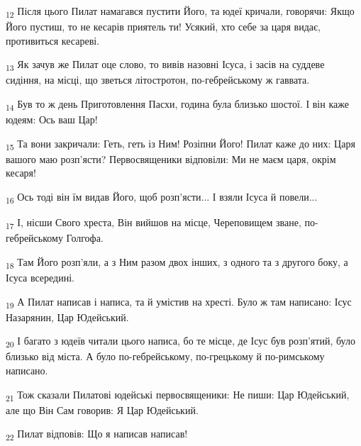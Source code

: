 \begin{tcolorbox}
\textsubscript{12} Після цього Пилат намагався пустити Його, та юдеї кричали, говорячи: Якщо Його пустиш, то не кесарів приятель ти! Усякий, хто себе за царя видає, противиться кесареві.
\end{tcolorbox}
\begin{tcolorbox}
\textsubscript{13} Як зачув же Пилат оце слово, то вивів назовні Ісуса, і засів на суддеве сидіння, на місці, що зветься літостротон, по-гебрейському ж гаввата.
\end{tcolorbox}
\begin{tcolorbox}
\textsubscript{14} Був то ж день Приготовлення Пасхи, година була близько шостої. І він каже юдеям: Ось ваш Цар!
\end{tcolorbox}
\begin{tcolorbox}
\textsubscript{15} Та вони закричали: Геть, геть із Ним! Розіпни Його! Пилат каже до них: Царя вашого маю розп'ясти? Первосвященики відповіли: Ми не маєм царя, окрім кесаря!
\end{tcolorbox}
\begin{tcolorbox}
\textsubscript{16} Ось тоді він їм видав Його, щоб розп'ясти... І взяли Ісуса й повели...
\end{tcolorbox}
\begin{tcolorbox}
\textsubscript{17} І, нісши Свого хреста, Він вийшов на місце, Череповищем зване, по-гебрейському Голгофа.
\end{tcolorbox}
\begin{tcolorbox}
\textsubscript{18} Там Його розп'яли, а з Ним разом двох інших, з одного та з другого боку, а Ісуса всередині.
\end{tcolorbox}
\begin{tcolorbox}
\textsubscript{19} А Пилат написав і написа, та й умістив на хресті. Було ж там написано: Ісус Назарянин, Цар Юдейський.
\end{tcolorbox}
\begin{tcolorbox}
\textsubscript{20} І багато з юдеїв читали цього написа, бо те місце, де Ісус був розп'ятий, було близько від міста. А було по-гебрейському, по-грецькому й по-римському написано.
\end{tcolorbox}
\begin{tcolorbox}
\textsubscript{21} Тож сказали Пилатові юдейські первосвященики: Не пиши: Цар Юдейський, але що Він Сам говорив: Я Цар Юдейський.
\end{tcolorbox}
\begin{tcolorbox}
\textsubscript{22} Пилат відповів: Що я написав написав!
\end{tcolorbox}
